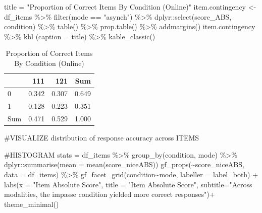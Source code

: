 \documentclass[
  letterpaper,
  DIV=11,
  numbers=noendperiod]{scrreprt}
\newenvironment{Shaded}{\begin{snugshade}}{\end{snugshade}}
\newcommand{\AttributeTok}[1]{\textcolor[rgb]{0.40,0.45,0.13}{#1}}
\newcommand{\CommentTok}[1]{\textcolor[rgb]{0.37,0.37,0.37}{#1}}
\newcommand{\FunctionTok}[1]{\textcolor[rgb]{0.28,0.35,0.67}{#1}}
\newcommand{\NormalTok}[1]{\textcolor[rgb]{0.00,0.23,0.31}{#1}}
\newcommand{\OtherTok}[1]{\textcolor[rgb]{0.00,0.23,0.31}{#1}}
\newcommand{\SpecialCharTok}[1]{\textcolor[rgb]{0.37,0.37,0.37}{#1}}
\newcommand{\StringTok}[1]{\textcolor[rgb]{0.13,0.47,0.30}{#1}}
\begin{document}
\begin{Shaded}
\begin{Highlighting}[]
\NormalTok{title }\OtherTok{=} \StringTok{"Proportion of Correct Items By Condition (Online)"}
\NormalTok{item.contingency }\OtherTok{\textless{}{-}}\NormalTok{ df\_items }\SpecialCharTok{\%\textgreater{}\%} \FunctionTok{filter}\NormalTok{(mode }\SpecialCharTok{==} \StringTok{"asynch"}\NormalTok{) }\SpecialCharTok{\%\textgreater{}\%}\NormalTok{ dplyr}\SpecialCharTok{::}\FunctionTok{select}\NormalTok{(score\_ABS, condition) }\SpecialCharTok{\%\textgreater{}\%} \FunctionTok{table}\NormalTok{() }\SpecialCharTok{\%\textgreater{}\%} \FunctionTok{prop.table}\NormalTok{() }\SpecialCharTok{\%\textgreater{}\%} \FunctionTok{addmargins}\NormalTok{()}
\NormalTok{item.contingency }\SpecialCharTok{\%\textgreater{}\%} \FunctionTok{kbl}\NormalTok{ (}\AttributeTok{caption =}\NormalTok{ title) }\SpecialCharTok{\%\textgreater{}\%} \FunctionTok{kable\_classic}\NormalTok{()}
\end{Highlighting}
\end{Shaded}

\begin{table}

\caption{Proportion of Correct Items By Condition (Online)}
\centering
\begin{tabular}[t]{l|r|r|r}
\hline
  & 111 & 121 & Sum\\
\hline
0 & 0.342 & 0.307 & 0.649\\
\hline
1 & 0.128 & 0.223 & 0.351\\
\hline
Sum & 0.471 & 0.529 & 1.000\\
\hline
\end{tabular}
\end{table}

\begin{Shaded}
\begin{Highlighting}[]
\CommentTok{\#VISUALIZE distribution of response accuracy across ITEMS}

\CommentTok{\#HISTOGRAM}
\NormalTok{stats }\OtherTok{=}\NormalTok{ df\_items }\SpecialCharTok{\%\textgreater{}\%} \FunctionTok{group\_by}\NormalTok{(condition, mode) }\SpecialCharTok{\%\textgreater{}\%}\NormalTok{ dplyr}\SpecialCharTok{::}\FunctionTok{summarise}\NormalTok{(}\AttributeTok{mean =} \FunctionTok{mean}\NormalTok{(score\_niceABS))}
\FunctionTok{gf\_props}\NormalTok{(}\SpecialCharTok{\textasciitilde{}}\NormalTok{score\_niceABS, }\AttributeTok{data =}\NormalTok{ df\_items) }\SpecialCharTok{\%\textgreater{}\%} 
  \FunctionTok{gf\_facet\_grid}\NormalTok{(condition}\SpecialCharTok{\textasciitilde{}}\NormalTok{mode, }\AttributeTok{labeller =}\NormalTok{ label\_both) }\SpecialCharTok{+}
  \FunctionTok{labs}\NormalTok{(}\AttributeTok{x =} \StringTok{"Item Absolute Score"}\NormalTok{,}
       \AttributeTok{title =} \StringTok{"Item Absolute Score"}\NormalTok{,}
       \AttributeTok{subtitle=}\StringTok{"Across modalities, the impasse condition yielded more correct responses"}\NormalTok{)}\SpecialCharTok{+}
  \FunctionTok{theme\_minimal}\NormalTok{()}
\end{Highlighting}
\end{Shaded}
\end{document}
